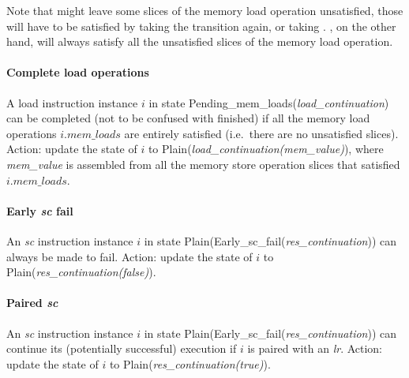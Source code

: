 \begin{commentary}
Note that  might leave some slices of the memory load operation unsatisfied, those will have to be satisfied by taking the transition again, or taking .
, on the other hand, will always satisfy all the unsatisfied slices of the memory load operation.
\end{commentary}


\paragraph{Complete load operations}\label{omm:complete_loads}
A load instruction instance $i$ in state {\sc Pending\_mem\_loads}({\it load\_continuation}) can be completed (not to be confused with finished) if all the memory load operations $i.\textit{mem\_loads}$ are entirely satisfied (i.e.~there are no unsatisfied slices).
Action: update the state of $i$ to {\sc Plain}({\it load\_continuation(mem\_value)}), where {\it mem\_value} is assembled from all the memory store operation slices that satisfied $i.\textit{mem\_loads}$.


\paragraph{Early {\em sc} fail}\label{omm:early_sc_fail}
An {\em sc} instruction instance $i$ in state {\sc Plain}({\sc Early\_sc\_fail}({\it res\_continuation})) can always be made to fail.
Action: update the state of $i$ to {\sc Plain}({\it res\_continuation(false)}).


\paragraph{Paired {\em sc}}\label{omm:paired_sc}
An {\em sc} instruction instance $i$ in state {\sc Plain}({\sc Early\_sc\_fail}({\it res\_continuation})) can continue its (potentially successful) execution if $i$ is paired with an {\em lr}.
Action: update the state of $i$ to {\sc Plain}({\it res\_continuation(true)}).


